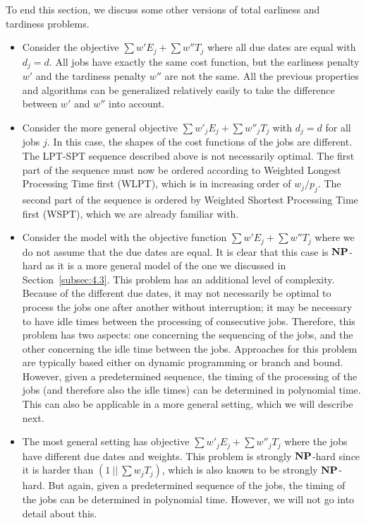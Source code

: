 To end this section, we discuss some other versions of total 
earliness and tardiness problems. 
\begin{itemize}

    \item Consider the objective $\sum w'E_j + \sum w''T_j$ where all 
    due dates are equal with $d_j = d$. All jobs have exactly the same 
    cost function, but the earliness penalty $w'$ and the tardiness 
    penalty $w''$ are not the same. All the previous properties and
    algorithms can be generalized relatively easily to take the 
    difference between $w'$ and $w''$ into account. 

    \item Consider the more general objective $\sum w'_j E_j + \sum w''_j T_j$ 
    with $d_j = d$ for all jobs $j$. In this case, the shapes of the cost 
    functions of the jobs are different. The LPT-SPT sequence described above 
    is not necessarily optimal. The first part of the sequence must now be 
    ordered according to Weighted Longest Processing Time first (WLPT), 
    which is in increasing order of $w_j/p_j$. The second part of the 
    sequence is ordered by Weighted Shortest Processing Time first (WSPT), 
    which we are already familiar with. 

    \item Consider the model with the objective function $\sum w'E_j + \sum w''T_j$
    where we do not assume that the due dates are equal. It is clear that this 
    case is $\operatorname{\textbf{NP}}$-hard as it is a more general model of the one we discussed in
    Section~\ref{subsec:4.3}. This problem has an additional level of complexity. Because of
    the different due dates, it may not necessarily be optimal to process the 
    jobs one after another without interruption; it may be necessary to have 
    idle times between the processing of consecutive jobs. Therefore, this 
    problem has two aspects: one concerning the sequencing of the jobs, 
    and the other concerning the idle time between the jobs. Approaches 
    for this problem are typically based either on dynamic programming 
    or branch and bound. However, given a predetermined sequence, the timing of 
    the processing of the jobs (and therefore also the idle times) can be 
    determined in polynomial time. This can also be applicable in a more 
    general setting, which we will describe next. 

    \item The most general setting has objective $\sum w'_j E_j + 
    \sum w''_j T_j$ where the jobs have different due dates and weights. 
    This problem is strongly $\operatorname{\textbf{NP}}$-hard since it is harder than 
    $(1~||~\sum w_j T_j)$, which is also known to be strongly $\operatorname{\textbf{NP}}$-hard.
    But again, given a predetermined sequence of the jobs, the timing 
    of the jobs can be determined in polynomial time. However, we will not 
    go into detail about this. 

\end{itemize} 

